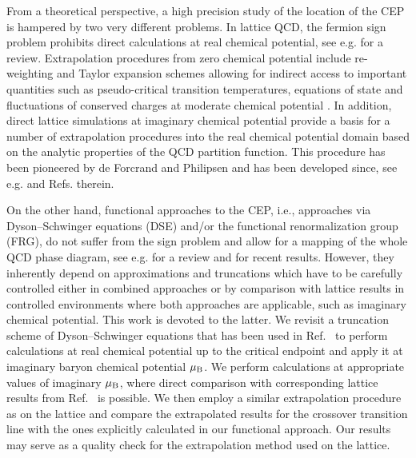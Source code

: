 \documentclass[%
    aps,
    prd,
    reprint,
    superscriptaddress,
    floatfix,
    nofootinbib,
    noamsmath,
    noamssymb
]{revtex4-2}
\newcommand*{\+}{\hspace*{.08335em}}
\newcommand*{\?}{\hspace*{-.08335em}}
\newcommand*{\muB}{\mu_{\textup{B}}}
\begin{document}
From a theoretical perspective, a high precision study of the location of the
CEP is hampered by two very different problems. In lattice QCD, the fermion sign
problem prohibits direct calculations at real chemical potential, see e.g.
\cite{Nagata2022} for a review. Extrapolation procedures from zero chemical potential 
include re-weighting \cite{Hasenfratz:1991ax,Fodor:2001au,Fodor:2001pe,Giordano:2020roi} 
and Taylor expansion schemes 
\cite{Allton:2002zi,Gavai:2008zr,Borsanyi:2012cr,Bazavov:2017dus,Giordano:2019gev,Bazavov2019,Bazavov:2020bjn,Bollweg2022}
allowing for indirect access to important quantities such as pseudo-critical 
transition temperatures, equations of state and fluctuations of conserved charges 
at moderate chemical potential \cite{Ratti:2022qgf}. In addition, direct lattice 
simulations at imaginary chemical potential provide a basis for a number of extrapolation
procedures into the real chemical potential domain based on the analytic properties
of the QCD partition function. This procedure has been pioneered by de Forcrand and Philipsen 
\cite{deForcrand:2002hgr} and has been developed since, see e.g.
\cite{Borsanyi:2020fev,Borsanyi:2021sxv,Dimopoulos:2021vrk,Borsanyi:2022soo,Borsanyi2022a}
 and Refs. therein. 
 
 On the other hand, functional approaches to the CEP, i.e.,
approaches via Dyson--Schwinger equations (DSE) and/or the functional
renormalization group (FRG), do not suffer from the sign problem and allow for
a mapping of the whole QCD phase diagram, see e.g. \cite{Fischer:2018sdj} for a
review and
\cite{Fischer:2014ata,Isserstedt:2019pgx,Fu:2019hdw,Gao:2020qsj,Gao:2020fbl,Gunkel:2021oya}
 for recent results. However, they inherently depend on approximations and
truncations which have to be carefully controlled either in combined approaches
or by comparison with lattice results in controlled environments where both
approaches are applicable, such as imaginary chemical potential. This work is
devoted to the latter. We revisit a truncation scheme of Dyson--Schwinger
equations that has been used in Ref.~\cite{Gunkel:2021oya} to perform
calculations at real chemical potential up to the critical endpoint and apply
it at imaginary baryon chemical potential $\muB$. We perform calculations at
appropriate values of imaginary $\muB$, where direct comparison with
corresponding lattice results from Ref.~\cite{Borsanyi:2020fev} is possible. We
then employ a similar extrapolation procedure as on the lattice and compare the
extrapolated results for the crossover transition line with the ones explicitly
calculated in our functional approach. Our results may serve as a quality check
for the extrapolation method used on the lattice.
\end{document}
